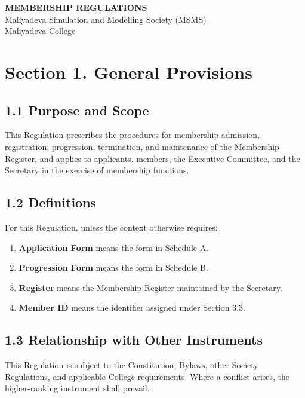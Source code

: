 \documentclass[a4paper]{article}
\begin{document}
\begin{center}
    \vspace{-1.5cm}
    {\LARGE\bfseries MEMBERSHIP REGULATIONS}\\[0.6em]
    {\large Maliyadeva Simulation and Modelling Society (MSMS)}\\[0.4em]
    {\normalsize Maliyadeva College}
\end{center}
\tableofcontents

\section*{Section 1. General Provisions}

\subsection*{1.1 Purpose and Scope}
This Regulation prescribes the procedures for membership admission,
registration, progression, termination, and maintenance of the
Membership Register, and applies to applicants, members, the Executive
Committee, and the Secretary in the exercise of membership functions.

\subsection*{1.2 Definitions}
For this Regulation, unless the context otherwise requires:
\begin{enumerate}
    \item \textbf{Application Form} means the form in Schedule A.
    \item \textbf{Progression Form} means the form in Schedule B.
    \item \textbf{Register} means the Membership Register maintained by
    the Secretary.
    \item \textbf{Member ID} means the identifier assigned under
    Section 3.3.
\end{enumerate}

\subsection*{1.3 Relationship with Other Instruments}
This Regulation is subject to the Constitution, Bylaws, other Society
Regulations, and applicable College requirements. Where a conflict
arises, the higher-ranking instrument shall prevail.
\end{document}
